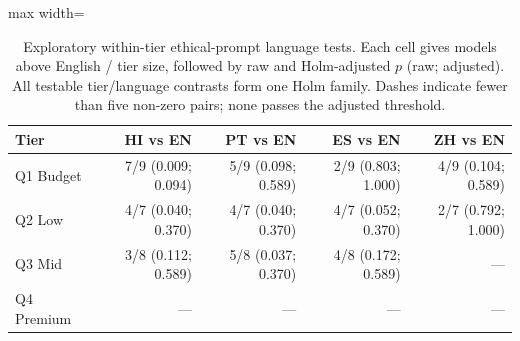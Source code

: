 \begin{table}[htbp]
\centering\scriptsize
\caption{Exploratory within-tier ethical-prompt language tests. Each cell gives models above English / tier size, followed by raw and Holm-adjusted $p$ (raw; adjusted). All testable tier/language contrasts form one Holm family. Dashes indicate fewer than five non-zero pairs; none passes the adjusted threshold.}
\label{tab:price-paired-langs}
\begin{adjustbox}{max width=\linewidth}
\begin{tabular}{lrrrr}
\toprule
Tier & HI vs EN & PT vs EN & ES vs EN & ZH vs EN \\
\midrule
Q1 Budget & 7/9 (0.009; 0.094) & 5/9 (0.098; 0.589) & 2/9 (0.803; 1.000) & 4/9 (0.104; 0.589) \\
Q2 Low & 4/7 (0.040; 0.370) & 4/7 (0.040; 0.370) & 4/7 (0.052; 0.370) & 2/7 (0.792; 1.000) \\
Q3 Mid & 3/8 (0.112; 0.589) & 5/8 (0.037; 0.370) & 4/8 (0.172; 0.589) & --- \\
Q4 Premium & --- & --- & --- & --- \\
\bottomrule
\end{tabular}
\end{adjustbox}
\end{table}

